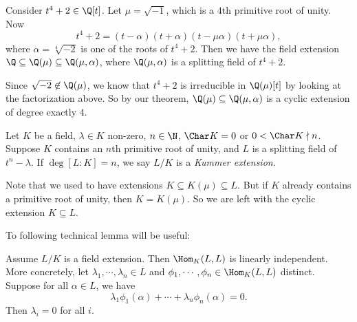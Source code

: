 \documentclass[a4paper]{article}
\begin{document}
\begin{eg}
  Consider $t^4 + 2 \in \Q[t]$. Let $\mu = \sqrt{-1}$, which is a $4$th primitive root of unity. Now
  \[
    t^4 + 2 = (t - \alpha)(t + \alpha)(t - \mu \alpha)(t + \mu \alpha),
  \]
  where $\alpha = \sqrt[4]{-2}$ is one of the roots of $t^4 + 2$. Then we have the field extension $\Q \subseteq \Q(\mu) \subseteq \Q(\mu, \alpha)$, where $\Q(\mu, \alpha)$ is a splitting field of $t^4 + 2$.

  Since $\sqrt{-2} \not\in \Q(\mu)$, we know that $t^4 + 2$ is irreducible in $\Q(\mu)[t]$ by looking at the factorization above. So by our theorem, $\Q(\mu) \subseteq \Q(\mu, \alpha)$ is a cyclic extension of degree exactly $4$.
\end{eg}

\begin{defi}
  Let $K$ be a field, $\lambda \in K$ non-zero, $n \in \N$, $\Char K = 0$ or $0 < \Char K \nmid n$. Suppose $K$ contains an $n$th primitive root of unity, and $L$ is a splitting field of $t^n - \lambda$. If $\deg [L:K] = n$, we say $L/K$ is a \emph{Kummer extension}.
\end{defi}
Note that we used to have extensions $K\subseteq K(\mu) \subseteq L$. But if $K$ already contains a primitive root of unity, then $K = K(\mu)$. So we are left with the cyclic extension $K \subseteq L$.

To following technical lemma will be useful:
\begin{lemma}
  Assume $L/K$ is a field extension. Then $\Hom_K(L, L)$ is linearly independent. More concretely, let $\lambda_1, \cdots, \lambda_n \in L$ and $\phi_1, \cdots, \phi_n \in \Hom_K(L, L)$ distinct. Suppose for all $\alpha \in L$, we have
  \[
    \lambda_1 \phi_1(\alpha) + \cdots + \lambda_n \phi_n(\alpha) = 0.
  \]
  Then $\lambda_i = 0$ for all $i$.
\end{lemma}
\end{document}
